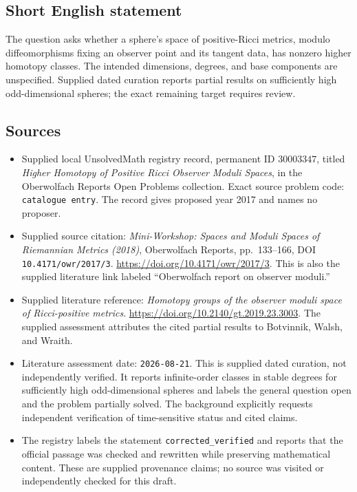 \documentclass[11pt]{article}
\begin{document}
\subsection{Short English statement}
The question asks whether a sphere's space of positive-Ricci metrics, modulo diffeomorphisms fixing an observer point and its tangent data, has nonzero higher homotopy classes. The intended dimensions, degrees, and base components are unspecified. Supplied dated curation reports partial results on sufficiently high odd-dimensional spheres; the exact remaining target requires review.
\subsection{Sources}
\begin{itemize}
\item Supplied local UnsolvedMath registry record, permanent ID \(30003347\), titled \emph{Higher Homotopy of Positive Ricci Observer Moduli Spaces}, in the Oberwolfach Reports Open Problems collection. Exact source problem code: \texttt{catalogue entry}. The record gives proposed year 2017 and names no proposer.
\item Supplied source citation: \emph{Mini-Workshop: Spaces and Moduli Spaces of Riemannian Metrics (2018)}, Oberwolfach Reports, pp.~133--166, DOI \texttt{10.4171/owr/2017/3}. \url{https://doi.org/10.4171/owr/2017/3}. This is also the supplied literature link labeled ``Oberwolfach report on observer moduli.''
\item Supplied literature reference: \emph{Homotopy groups of the observer moduli space of Ricci-positive metrics}. \url{https://doi.org/10.2140/gt.2019.23.3003}. The supplied assessment attributes the cited partial results to Botvinnik, Walsh, and Wraith.
\item Literature assessment date: \texttt{2026-08-21}. This is supplied dated curation, not independently verified. It reports infinite-order classes in stable degrees for sufficiently high odd-dimensional spheres and labels the general question open and the problem partially solved. The background explicitly requests independent verification of time-sensitive status and cited claims.
\item The registry labels the statement \texttt{corrected\_verified} and reports that the official passage was checked and rewritten while preserving mathematical content. These are supplied provenance claims; no source was visited or independently checked for this draft.
\end{itemize}
\end{document}
